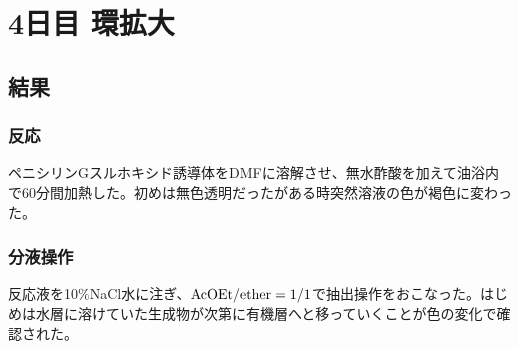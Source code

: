 \documentclass[a4paper,papersize,dvipdfmx]{jsarticle}
\begin{document}
\section*{4日目 環拡大}
\subsection*{結果}

\subsubsection*{反応}
ペニシリンGスルホキシド誘導体をDMFに溶解させ、無水酢酸を加えて油浴内で60分間加熱した。初めは無色透明だったがある時突然溶液の色が褐色に変わった。

\subsubsection*{分液操作}
反応液を10$\%$NaCl水に注ぎ、$\rm AcOEt / ether = 1/1$で抽出操作をおこなった。はじめは水層に溶けていた生成物が次第に有機層へと移っていくことが色の変化で確認された。
\end{document}

